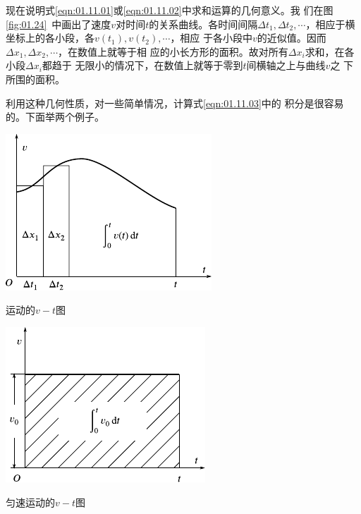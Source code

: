 现在说明式\eqref{eqn:01.11.01}或\eqref{eqn:01.11.02}中求和运算的几何意义。我
们在图\ref{fig:01.24}~中画出了速度$v$对时间$t$的关系曲线。各时间间隔$\Delta t_1 , \Delta t_2 , \cdots$，相应于横坐标上的各小段，各$v\left(t_1\right) , v\left(t_2\right) , \cdots$，相应
于各小段中$ v $的近似值。因而$\Delta x_1 , \Delta x_2 , \cdots$，在数值上就等于相
应的小长方形的面积。故对所有$\Delta x_i$求和，在各小段$\Delta x_i$都趋于
无限小的情况下，在数值上就等于零到$t$间横轴之上与曲线$v$之
下所围的面积。

利用这种几何性质，对一些简单情况，计算式\eqref{eqn:01.11.03}中的
积分是很容易的。下面举两个例子。
\begin{figurex}[!h]
  \begin{minipage}[b]{14em}
    \centering
    \includegraphics[width=0.8\linewidth]{figure/fig01.24}
    \caption{运动的$v-t$图}
    \label{fig:01.24}
  \end{minipage}\hfill
  \begin{minipage}[b]{14em}
    \centering
    \includegraphics[width=0.8\linewidth]{figure/fig01.25}
    \caption{匀速运动的$v-t$图}
    \label{fig:01.25}
  \end{minipage}
\end{figurex}

